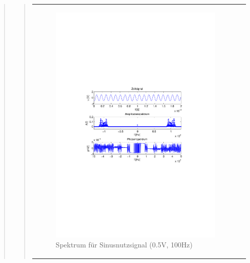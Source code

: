 \begin{quote}
\begin{quote}
\begin{center}
\begin{tabular}{ll}
\begin{minipage}{0.6\textwidth}
                \end{minipage}
                \begin{minipage}{0.6\textwidth}

                     \begin{figure}[H]
                        \label{fig:}
                        \includegraphics[scale=0.5, trim = 2cm 6.5cm 1.5cm
                        8.5cm, clip]{./Bilder/sin_a05_f100}
                        \caption{Spektrum für Sinusnutzsignal (0.5V, 100Hz)}
                    \end{figure}
               \vspace{-1.5em}

                \end{minipage}

            \end{tabular}
            \end{center}
            

\end{quote}
\end{quote}
